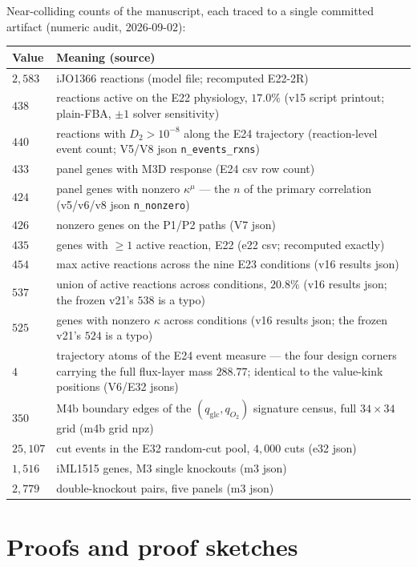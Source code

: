 \documentclass[11pt,a4paper]{article}
\theoremstyle{plain}
\theoremstyle{definition}
\theoremstyle{remark}
\newcommand{\kmu}{\kappa^{\mu}}
\begin{document}
Near-colliding counts of the manuscript, each traced to a single
committed artifact (numeric audit, 2026-09-02):

\begin{tabularx}{\textwidth}{lX}
\toprule
\textbf{Value} & \textbf{Meaning (source)} \\
\midrule
$2{,}583$ & iJO1366 reactions (model file; recomputed E22-2R) \\
$438$ & reactions active on the E22 physiology, $17.0\%$ (v15
         script printout; plain-FBA, $\pm 1$ solver sensitivity) \\
$440$ & reactions with $D_2 > 10^{-8}$ along the E24 trajectory
         (reaction-level event count; V5/V8 json
         \texttt{n\_events\_rxns}) \\
$433$ & panel genes with M3D response (E24 csv row count) \\
$424$ & panel genes with nonzero $\kmu$ --- the $n$ of the primary
         correlation (v5/v6/v8 json \texttt{n\_nonzero}) \\
$426$ & nonzero genes on the P1/P2 paths (V7 json) \\
$435$ & genes with $\ge 1$ active reaction, E22 (e22 csv;
         recomputed exactly) \\
$454$ & max active reactions across the nine E23 conditions (v16
         results json) \\
$537$ & union of active reactions across conditions, $20.8\%$ (v16
         results json; the frozen v21's $538$ is a typo) \\
$525$ & genes with nonzero $\kappa$ across conditions (v16 results
         json; the frozen v21's $524$ is a typo) \\
$4$ & trajectory atoms of the E24 event measure --- the four design
         corners carrying the full flux-layer mass $288.77$; identical
         to the value-kink positions (V6/E32 jsons) \\
$350$ & M4b boundary edges of the $(q_{\mathrm{glc}}, q_{O_2})$ signature
         census, full $34\times34$ grid (m4b grid npz) \\
$25{,}107$ & cut events in the E32 random-cut pool, $4{,}000$ cuts
         (e32 json) \\
$1{,}516$ & iML1515 genes, M3 single knockouts (m3 json) \\
$2{,}779$ & double-knockout pairs, five panels (m3 json) \\
\bottomrule
\end{tabularx}

\section{Proofs and proof sketches}\label{sec:proofs}
\end{document}
